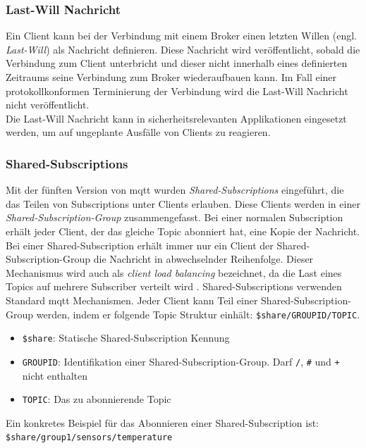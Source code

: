 \subsubsection{Last-Will Nachricht} \label{s:last-will}
Ein Client kann bei der Verbindung mit einem Broker einen letzten Willen (engl. \textit{Last-Will}) als Nachricht definieren. Diese Nachricht wird veröffentlicht, sobald die Verbindung zum Client unterbricht und dieser nicht innerhalb eines definierten Zeitraums seine Verbindung zum Broker wiederaufbauen kann.
Im Fall einer protokollkonformen Terminierung der Verbindung wird die Last-Will Nachricht nicht veröffentlicht.
\cite{soniSURVEYMQTTPROTOCOL}\\
Die Last-Will Nachricht kann in sicherheitsrelevanten Applikationen eingesetzt werden, um auf ungeplante Ausfälle von Clients zu reagieren.

\subsubsection{Shared-Subscriptions} \label{s:shared-subscriptions}
Mit der fünften Version von \ac{mqtt} wurden \textit{Shared-Subscriptions} eingeführt, die das Teilen von Subscriptions unter Clients erlauben. Diese Clients werden in einer \textit{Shared-Subscription-Group} zusammengefasst. Bei einer normalen Subscription erhält jeder Client, der das gleiche Topic abonniert hat, eine Kopie der Nachricht. Bei einer Shared-Subscription erhält immer nur ein Client der Shared-Subscription-Group die Nachricht in abwechselnder Reihenfolge. Dieser Mechanismus wird auch als \textit{client load balancing} bezeichnet, da die Last eines Topics auf mehrere Subscriber verteilt wird \cite{raschbichlerMQTTHowNew}.
Shared-Subscriptions verwenden Standard \ac{mqtt} Mechanismen. Jeder Client kann Teil einer Shared-Subscription-Group werden, indem er folgende Topic Struktur einhält: \verb|$share/GROUPID/TOPIC|.
\begin{itemize}
    \item \verb|$share|: Statische Shared-Subscription Kennung
    \item \verb|GROUPID|: Identifikation einer Shared-Subscription-Group. Darf \verb|/|, \verb|#| und \verb|+| nicht enthalten
    \item \verb|TOPIC|: Das zu abonnierende Topic
\end{itemize}
Ein konkretes Beispiel für das Abonnieren einer Shared-Subscription ist:
\newline
\verb|$share/group1/sensors/temperature|

